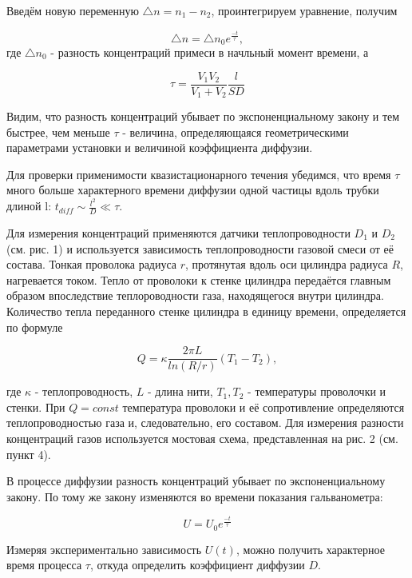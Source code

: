\documentclass[a4paper, 12pt]{article} %
\begin{document}
Введём новую переменную $\triangle n = n_1-n_2$, проинтегрируем уравнение, получим

\begin{equation}
    \triangle n = \triangle n_0 e^{\frac{-t}{\tau}},
\end{equation}
где $\triangle n_0$ - разность концентраций примеси в начльный момент времени, а

\begin{equation}
    \tau = \frac{V_1 V_2}{V_1 + V_2} \frac {l}{SD}
\end{equation}

Видим, что разность концентраций убывает по экспоненциальному закону и тем быстрее, чем меньше $\tau$ - величина, определяющаяся геометрическими параметрами установки и величиной коэффициента диффузии.

Для проверки применимости квазистационарного течения убедимся, что время $\tau$ много больше характерного времени диффузии одной частицы вдоль трубки длиной l: $t_{diff} \sim \frac{l^2}{D} \ll \tau$.

Для измерения концентраций применяются датчики теплопроводности $D_1$ и $D_2$ (см. рис. 1) и используется зависимость теплопроводности газовой смеси от её состава. Тонкая проволока радиуса $r$, протянутая вдоль оси цилиндра радиуса $R$, нагревается током. Тепло от проволоки к стенке цилиндра передаётся главным образом впоследствие теплороводности газа, находящегося внутри цилиндра. Количество тепла переданного стенке цилиндра в единицу времени, определяется по формуле

\begin{equation}
    Q = \kappa \frac{2\pi L}{ln (R/r)}(T_1-T_2),
\end{equation}

где $\kappa$ - теплопроводность, $L$ - длина нити, $T_1, T_2$ - температуры проволочки и стенки. При $Q = const$ температура проволоки и её сопротивление определяются теплопроводностью газа и, следовательно, его составом. Для измерения разности концентраций газов используется  
мостовая схема, представленная на рис. 2 (см. пункт 4).

В процессе диффузии разность концентраций убывает по экспоненциальному закону. По тому же закону изменяются во времени показания гальванометра:

\begin{equation}
    U = U_0 e^{\frac{-t}{\tau}}
\end{equation}

Измеряя экспериментально зависимость $U(t)$, можно получить характерное время процесса $\tau$, откуда определить коэффициент диффузии $D$.
\end{document}
